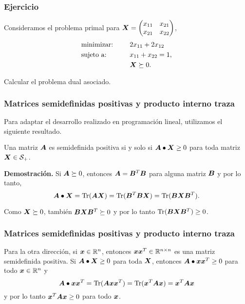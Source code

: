 \documentclass[aspectratio=169,12pt,spanish]{beamer}
\begin{document}
\begin{frame}
\frametitle{Ejercicio}

Consideramos el problema primal para $\bm{X} = \begin{pmatrix} x_{11} & x_{21} \\ x_{21} & x_{22} \end{pmatrix}$,
\begin{alignat*}{2}
  & \text{minimizar: }  & \quad & 2x_{11} + 2x_{12}   \\
   & \text{sujeto a: } & \quad & x_{11} + x_{22} = 1, \\
   & & &  \bm{X} \succeq 0.
\end{alignat*}

Calcular el problema dual asociado.

\end{frame}


\begin{frame}
\frametitle{Matrices semidefinidas positivas y producto interno traza}


Para adaptar el desarrollo realizado en programación lineal, utilizamos el siguiente resultado.

\begin{theorem}
Una matriz $\bm{A}$ es semidefinida positiva si y solo si $\bm{A} \bullet \bm{X} \ge 0$ para toda matriz $\bm{X} \in {\mathcal S_+}$.
\label{teo:traza}
\end{theorem}

\textbf{Demostración.}
Si $\bm{A} \succeq 0$, entonces $\bm{A} = \bm{B}^T \bm{B}$ para alguna matriz $\bm{B}$ y por lo tanto,
$$
\bm{A} \bullet \bm{X} = \operatorname{Tr}(\bm{A}\bm{X}) = \operatorname{Tr}(\bm{B}^T \bm{B} \bm{X}) = \operatorname{Tr}(\bm{B} \bm{X} \bm{B}^T).
$$

Como $\bm{X} \succeq 0$, también $\bm{B} \bm{X} \bm{B}^T \succeq 0$ y por lo tanto $\operatorname{Tr}(\bm{B} \bm{X} \bm{B}^T) \ge 0$.

\end{frame}


\begin{frame}
\frametitle{Matrices semidefinidas positivas y producto interno traza}

Para la otra dirección, si $\bm{x} \in \mathbb{R}^n$, entonces $\bm{x} \bm{x}^T \in \mathbb{R}^{n\times n}$ es una matriz semidefinida positiva. Si $\bm{A} \bullet \bm{X} \ge 0$ para toda $\bm{X}$, entonces $\bm{A} \bullet \bm{x} \bm{x}^T  \ge 0$ para todo $\bm{x} \in \mathbb{R}^{n}$ y
$$
\bm{A} \bullet \bm{x}\bm{x}^T = \operatorname{Tr}(\bm{A} \bm{x} \bm{x}^T) = \operatorname{Tr}(\bm{x}^T \bm{A} \bm{x}) = \bm{x}^T \bm{A} \bm{x}
$$
y por lo tanto $\bm{x}^T \bm{A} \bm{x} \ge 0$ para todo $\bm{x}$.



\end{frame}
\end{document}

